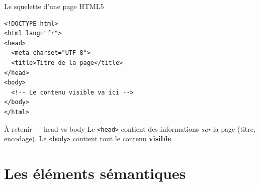 \documentclass[aspectratio=169,11pt]{beamer}
\begin{document}
\begin{frame}[fragile]{Le squelette d'une page HTML5}
\begin{lstlisting}[language=HTML5]
<!DOCTYPE html>
<html lang="fr">
<head>
  <meta charset="UTF-8">
  <title>Titre de la page</title>
</head>
<body>
  <!-- Le contenu visible va ici -->
</body>
</html>
\end{lstlisting}
  \begin{alertblock}{À retenir --- head vs body}
    Le \texttt{<head>} contient des informations \emph{sur} la page (titre, encodage). Le \texttt{<body>} contient tout le contenu \textbf{visible}.
  \end{alertblock}
\end{frame}

\section{Les éléments sémantiques}
{
\begin{frame}[plain]
\end{frame}
}
\end{document}
